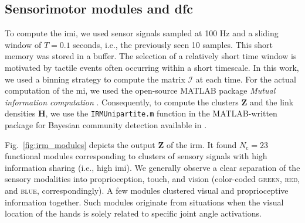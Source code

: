     
\subsection{Sensorimotor modules and \ac{dfc}}
To compute the \ac{imi}, we used sensor signals sampled at 100 Hz and a sliding window of $T = 0.1$ seconds, i.e., the previously seen 10 samples. This short memory was stored in a buffer. The selection of a relatively short time window is motivated by tactile events often occurring within a short timescale. In this work, we used a binning strategy to compute the matrix $\bm{\mathcal{I}}$ at each time. For the actual computation of the \ac{mi}, we used the open-source MATLAB package \emph{Mutual information computation} \cite{PengMutualInformationcomputation}. Consequently, to compute the clusters $\bm{Z}$ and the link densities $\bm{H}$, we use the \texttt{IRMUnipartite.m} function in the MATLAB-written package for Bayesian community detection available in \cite{Morup2025IRM}. 

Fig.~\ref{fig:irm_modules} depicts the output $\bm{Z}$ of the \ac{irm}. It found $N_\text{c} = 23$ functional modules corresponding to clusters of sensory signals with high information sharing (i.e., high \ac{imi}). 
We generally observe a clear separation of the sensory modalities into proprioception, touch, and vision (color-coded \textsc{green}, \textsc{red}, and \textsc{blue}, correspondingly). A few modules clustered visual and proprioceptive information together. Such modules originate from situations when the visual location of the hands is solely related to specific joint angle activations. 

